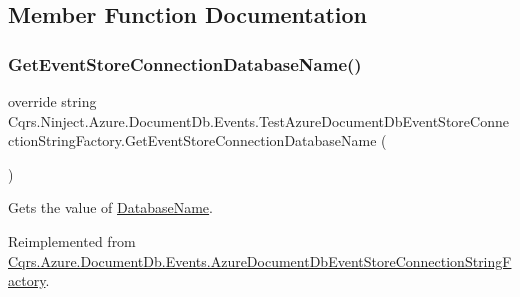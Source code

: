 \subsection{Member Function Documentation}
\mbox{\label{classCqrs_1_1Ninject_1_1Azure_1_1DocumentDb_1_1Events_1_1TestAzureDocumentDbEventStoreConnectionStringFactory_a85b4e6cd45d285be6de5db19148118b9_a85b4e6cd45d285be6de5db19148118b9}} 
\subsubsection{\texorpdfstring{Get\+Event\+Store\+Connection\+Database\+Name()}{GetEventStoreConnectionDatabaseName()}}
{\footnotesize\ttfamily override string Cqrs.\+Ninject.\+Azure.\+Document\+Db.\+Events.\+Test\+Azure\+Document\+Db\+Event\+Store\+Connection\+String\+Factory.\+Get\+Event\+Store\+Connection\+Database\+Name (\begin{DoxyParamCaption}{ }\end{DoxyParamCaption})\hspace{0.3cm}{\ttfamily [virtual]}}



Gets the value of \hyperlink{classCqrs_1_1Ninject_1_1Azure_1_1DocumentDb_1_1Events_1_1TestAzureDocumentDbEventStoreConnectionStringFactory_ad82e2485313ff7802ad125958173f3bf_ad82e2485313ff7802ad125958173f3bf}{Database\+Name}. 



Reimplemented from \hyperlink{classCqrs_1_1Azure_1_1DocumentDb_1_1Events_1_1AzureDocumentDbEventStoreConnectionStringFactory_af243f79315140e1f2c20a5c1695f4fb9_af243f79315140e1f2c20a5c1695f4fb9}{Cqrs.\+Azure.\+Document\+Db.\+Events.\+Azure\+Document\+Db\+Event\+Store\+Connection\+String\+Factory}.

